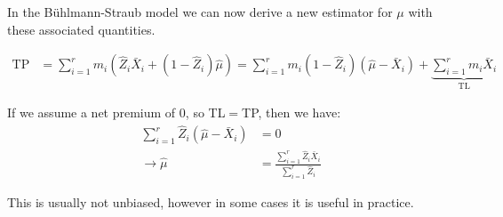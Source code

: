 \documentclass[english,12pt]{article}
\theoremstyle{plain}
\theoremstyle{definition}
\theoremstyle{definition} %
\newcommand{\brac}[1]{\left(#1\right)} %
\begin{document}
In the B\"{u}hlmann-Straub model we can now derive a new estimator for $\mu$ with these associated quantities.

\begin{align*}
\text{TP}&=\sum\limits_{i=1}^rm_i\brac{\hat{Z}_i\bar{X}_i+(1-\hat{Z}_i)\hat{\mu}}
=\sum\limits_{i=1}^rm_i(1-\hat{Z}_i)(\hat{\mu}-\bar{X}_i)+\underbrace{\sum\limits_{i=1}^rm_i\bar{X}_i}_{\text{TL}}
\end{align*}

If we assume a net premium of $0$, so TL$=$TP, then we have:
\begin{align*}
\sum\limits_{i=1}^r\hat{Z}_i(\hat{\mu}-\bar{X}_i)&=0\\
\rightarrow\hat{\mu}&=\frac{\sum\limits_{i=1}^r\hat{Z}_i\bar{X}_i}{\sum\limits_{i=1}^r\hat{Z}_i}
\end{align*}

This is usually not unbiased, however in some cases it is useful in practice.
\end{document}
